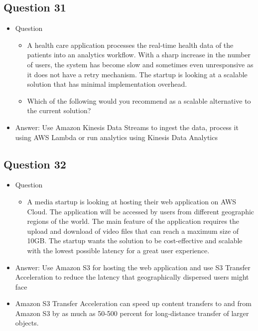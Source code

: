 \documentclass[]{scrartcl}
\begin{document}
\subsection{Question 31}
\begin{itemize}
	\item Question
	\begin{itemize}
		\item A health care application processes the real-time health data of the patients into an analytics workflow. With a sharp increase in the number of users, the system has become slow and sometimes even unresponsive as it does not have a retry mechanism. The startup is looking at a scalable solution that has minimal implementation overhead.
		\item Which of the following would you recommend as a scalable alternative to the current solution?
	\end{itemize}
	\item Answer: Use Amazon Kinesis Data Streams to ingest the data, process it using AWS Lambda or run analytics using Kinesis Data Analytics
\end{itemize}

\subsection{Question 32}
\begin{itemize}
	\item Question
	\begin{itemize}
		\item A media startup is looking at hosting their web application on AWS Cloud. The application will be accessed by users from different geographic regions of the world. The main feature of the application requires the upload and download of video files that can reach a maximum size of 10GB. The startup wants the solution to be cost-effective and scalable with the lowest possible latency for a great user experience.
	\end{itemize}
	\item Answer: Use Amazon S3 for hosting the web application and use S3 Transfer Acceleration to reduce the latency that geographically dispersed users might face
	\item Amazon S3 Transfer Acceleration can speed up content transfers to and from Amazon S3 by as much as 50-500 percent for long-distance transfer of larger objects.
\end{itemize}
\end{document}
